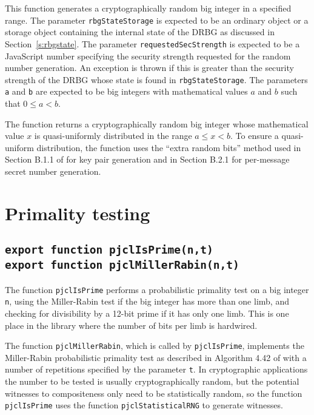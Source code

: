 \documentclass[12pt]{article}
\begin{document}
This function generates a cryptographically random big integer
in a specified range.
The parameter {\tt rbgStateStorage} is expected to be an ordinary
object or a storage object containing the internal state of the DRBG 
as discussed in Section~\ref{s:rbgstate}.
The parameter {\tt requestedSecStrength} is expected to be a
JavaScript number specifying the security strength requested for
the random number generation.  An exception is thrown if this is greater
than the security strength of the DRBG whose state is found in 
{\tt rbgStateStorage}.
The parameters
{\tt a} and {\tt b} are expected to be big integers with mathematical
values $a$ and $b$ such that $0 \leq a < b$.  

The function returns a
cryptographically random big integer whose mathematical value $x$ is
quasi-uniformly distributed in the range $a \leq x < b$.  To ensure a
quasi-uniform distribution, the function uses the ``extra random
bits'' method used in Section B.1.1 of \cite{DSS-4} for key pair
generation and in Section B.2.1 for per-message secret number
generation.

\section{Primality testing}

\subsection{\tt export function pjclIsPrime(n,t)\\export function pjclMillerRabin(n,t)}

The function {\tt pjclIsPrime} performs a probabilistic primality test
on a big integer {\tt n}, using the Miller-Rabin test if the big
integer has more than one limb, and checking for divisibility by a
12-bit prime if it has only one limb.  This is one place in the
library where the number of bits per limb is hardwired.  

The function
{\tt pjclMillerRabin}, which is called by {\tt pjclIsPrime}, implements the Miller-Rabin probabilistic
primality test as described in Algorithm 4.42 of
\cite{Menezes97handbookof} with a number of repetitions specified by the parameter {\tt t}.  
In
cryptographic applications the number to be tested is usually
cryptographically random, but the potential witnesses to compositeness only need to be
statistically random, so the function {\tt pjclIsPrime} uses the
function {\tt pjclStatisticalRNG} to generate witnesses.
\end{document}
